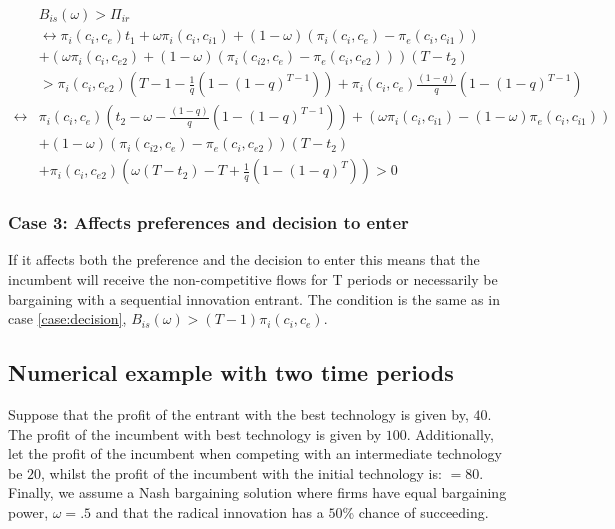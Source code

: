 \begin{align*}
&B_{is}(\omega)>\Pi_{ir}
\\
& \leftrightarrow \pi_i(c_i,c_{e})t_1 
+\omega \pi_i(c_i,c_{i1})+(1-\omega)(\pi_i(c_i,c_{e})-\pi_e(c_i,c_{i1}))
\\&+(\omega \pi_i(c_i,c_{e2})+(1-\omega)(\pi_i(c_{i2},c_e)-\pi_e(c_{i},c_{e2})))(T-t_2)  \\
&> \pi_{i}(c_i,c_{e2}) \left( T-1 - \frac{1}{q} \left( 1-(1-q)^{T-1} \right) \right)
+\pi_i(c_i,c_e) \frac{(1-q)}{q} \left( 1-(1-q)^{T-1} \right) \\
\leftrightarrow &\pi_i(c_i,c_e)(t_2 -\omega-\frac{(1-q)}{q} \left( 1-(1-q)^{T-1} \right)) 
+(\omega \pi_i(c_i,c_{i1})-(1-\omega)\pi_e(c_i,c_{i1})) \\
& +(1-\omega)(\pi_i(c_{i2},c_e)-\pi_e(c_{i},c_{e2}))(T-t_2) \\
&+ \pi_i(c_{i},c_{e2})\left(\omega(T-t_2)-T+\frac{1}{q} \left( 1-(1-q)^{T} \right)\right)
> 0
\end{align*}

\subsubsection{Case 3: Affects preferences and decision to enter}\label{case:both}

If it affects both the preference and the decision to enter this means that the incumbent will receive the non-competitive flows for T periods or necessarily be bargaining with a sequential innovation entrant. The condition is the same as in case \ref{case:decision}, $ B_{is}(\omega)>(T-1) \pi_i(c_i,c_e)$.

\subsection{Numerical example with two time periods}

Suppose that the profit of the entrant with the best technology is given by, $40$. The profit of the incumbent with best technology is given by $100$. Additionally, let the profit of the incumbent when competing with an intermediate technology be $20$, whilst the profit of the incumbent with the initial technology is: $=80$. Finally, we assume a Nash bargaining solution where firms have equal bargaining power, $\omega = .5$ and that the radical innovation has a $50$\% chance of succeeding. 

